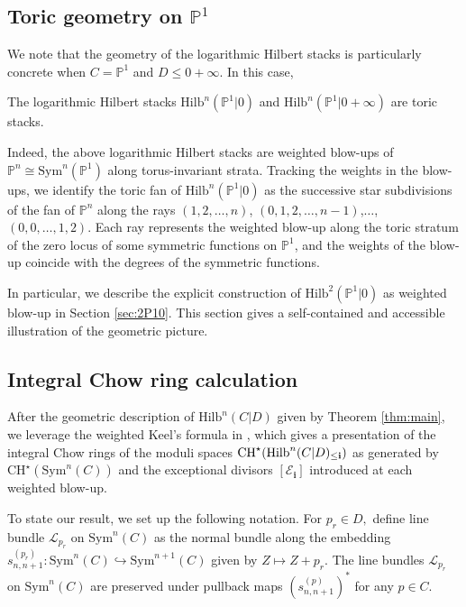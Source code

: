 \documentclass[10.5pt]{amsart}
\theoremstyle{definition}
\theoremstyle{definition}
\newenvironment{customcor}[1]
  {\renewcommand\theinnercustomcor{#1}\innercustomcor}
  {\endinnercustomcor}
\theoremstyle{definition}
\theoremstyle{definition}
\newcommand{\PP}{\mathbb{P}}
\newcommand{\Hilb}{\mathrm{Hilb}}
\newcommand{\Sym}{\mathrm{Sym}}
\newcommand{\CHs}{\mathrm{CH}^\star}
\newcommand{\cE}{\mathcal{E}}
\newcommand{\cL}{\mathcal{L}}
\newcommand{\bi}{\boldsymbol{i}}
\begin{document}
\subsection{Toric geometry on $\mathbb{P}^1$}
We note that the geometry of the logarithmic Hilbert stacks is particularly concrete when $C = \PP^1$ and $D\leq 0+\infty.$ In this case,

\begin{customcor}{\ref{cor:P1}}
     The logarithmic Hilbert stacks $\Hilb^n(\PP^1|0)$ and $\Hilb^n(\PP^1|0+\infty)$ are toric stacks.
\end{customcor}

Indeed, the above logarithmic Hilbert stacks are weighted blow-ups of $\PP^n\cong \Sym^n(\PP^1)$ along torus-invariant strata. Tracking the weights in the blow-ups, we identify the toric fan of $\Hilb^n(\PP^1|0)$ as the successive star subdivisions of the fan of $\PP^n$ along the rays $(1,2,\dots,n)$, $(0,1,2,\dots, n-1)$,$\dots$, $(0,0,\dots,1,2).$ Each ray represents the weighted blow-up along the toric stratum of the zero locus of some symmetric functions on $\PP^1$, and the weights of the blow-up coincide with the degrees of the symmetric functions.

In particular, we describe the explicit construction of $\Hilb^2(\PP^1|0)$ as weighted blow-up in Section \ref{sec:2P10}. This section gives a self-contained and accessible illustration of the geometric picture. 

\subsection{Integral Chow ring calculation} After the geometric description of $\Hilb^n(C|D)$ given by Theorem \ref{thm:main}, we leverage the weighted Keel's formula in \cite{Arena2025}, which gives a presentation of the integral Chow rings of the moduli spaces $\CHs(\Hilb^n(C|D)_{\le \bf i})$ as generated by $\mathrm{CH}^\star(\mathrm{Sym}^n(C))$ and the exceptional divisors $[\cE_{\bi}]$ introduced at each weighted blow-up. 

To state our result, we set up the following notation. For $p_r\in D,$ define line bundle $\cL_{p_r}$ on $\Sym^n(C)$ as the normal bundle along the embedding $s_{n, n+1}^{(p_r)}:\Sym^n(C)\hookrightarrow \Sym^{n+1}(C)$ given by $Z\mapsto Z+p_r.$ The line bundles $\cL_{p_r}$ on $\Sym^n(C)$ are preserved under pullback maps $(s_{n,n+1}^{(p)})^*$ for any $p\in C.$
\end{document}

